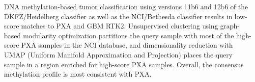 DNA methylation-based tumor classification using versions 11b6 and 12b6 of the DKFZ/Heidelberg classifier as well as the NCI/Bethesda classifier results in low-score matches to PXA and GBM RTK2.
Unsupervised clustering using graph-based modularity optimization partitions the query sample with most of the high-score PXA samples in the NCI database, and dimensionality reduction with UMAP (Uniform Manifold Approximation and Projection) places the query sample in a region enriched for high-score PXA samples.
Overall, the consensus methylation profile is most consistent with PXA.
